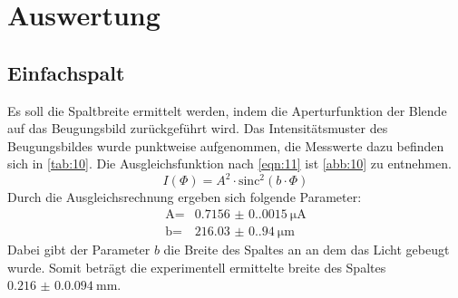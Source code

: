 \section{Auswertung}
\subsection{Einfachspalt}
Es soll die Spaltbreite ermittelt werden, indem die Aperturfunktion der Blende
auf das Beugungsbild zurückgeführt wird. Das Intensitätsmuster des Beugungsbildes
wurde punktweise aufgenommen, die Messwerte dazu befinden sich in \autoref{tab:10}.
Die Ausgleichsfunktion nach \autoref{eqn:11} ist \autoref{abb:10} zu entnehmen.
\begin{equation}
    \label{eqn:11}
    I\left(\Phi\right) = A^2 \cdot \text{sinc}^2\left(b \cdot \Phi\right) 
\end{equation}
\noindent Durch die Ausgleichsrechnung ergeben sich folgende Parameter:
\begin{align}
    \text{A} = & \qty{0.7156(0.0015)}{\micro\ampere} \\
    \text{b} = & \qty{216.03(0.94)}{\micro\meter}
\end{align}
Dabei gibt der Parameter $b$ die Breite des Spaltes an an dem das Licht gebeugt
wurde. Somit beträgt die experimentell ermittelte breite des Spaltes 
$\qty{0.216(0.0094)}{\milli\meter}$.

